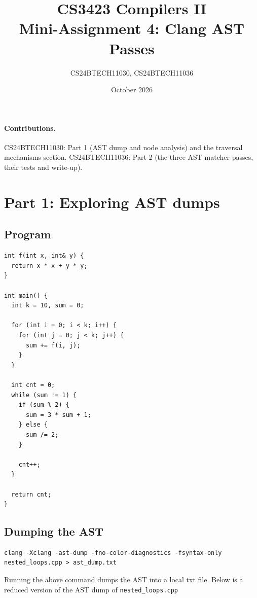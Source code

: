 \documentclass[11pt,a4paper]{article}
\title{CS3423 Compilers II\\Mini-Assignment 4: Clang AST Passes}
\author{CS24BTECH11030, CS24BTECH11036}
\date{October 2026}
\begin{document}
\maketitle

\paragraph{Contributions.}
CS24BTECH11030: Part 1 (AST dump and node analysis) and the traversal mechanisms section.
CS24BTECH11036: Part 2 (the three AST-matcher passes, their tests and write-up).

\section{Part 1: Exploring AST dumps}

\subsection{Program}

\begin{Verbatim}[fontsize=\footnotesize,frame=single]
int f(int x, int& y) {
  return x * x + y * y;
}

int main() {
  int k = 10, sum = 0;
  
  for (int i = 0; i < k; i++) {
    for (int j = 0; j < k; j++) {
      sum += f(i, j);
    }
  }

  int cnt = 0;
  while (sum != 1) {
    if (sum % 2) {
      sum = 3 * sum + 1;
    } else {
      sum /= 2;
    }

    cnt++;
  }

  return cnt;
}
\end{Verbatim}

\subsection{Dumping the AST}
\begin{Verbatim}[fontsize=\footnotesize]
clang -Xclang -ast-dump -fno-color-diagnostics -fsyntax-only nested_loops.cpp > ast_dump.txt
\end{Verbatim}
Running the above command dumps the AST into a local txt file. Below is a reduced version of the AST dump of \texttt{nested\_loops.cpp}
\end{document}
